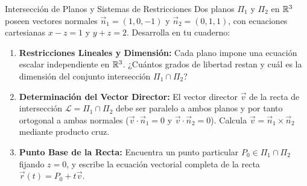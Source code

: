 \documentclass[10pt,aspectratio=169]{beamer}
\begin{document}
\begin{frame}{Intersección de Planos y Sistemas de Restricciones}
  \vspace{0.05cm}
  Dos planos $\Pi_1$ y $\Pi_2$ en $\mathbb{R}^3$ poseen vectores normales $\vec{n}_1 = (1, 0, -1)$ y $\vec{n}_2 = (0, 1, 1)$, con ecuaciones cartesianas $x - z = 1$ y $y + z = 2$. Desarrolla en tu cuaderno:
  \vspace{0.25cm}
  \begin{enumerate}\itemsep10pt
    \item[(a)] \textbf{Restricciones Lineales y Dimensión:} Cada plano impone una ecuación escalar independiente en $\mathbb{R}^3$. ¿Cuántos grados de libertad restan y cuál es la dimensión del conjunto intersección $\Pi_1 \cap \Pi_2$?
    \item[(b)] \textbf{Determinación del Vector Director:} El vector director $\vec{v}$ de la recta de intersección $\mathcal{L} = \Pi_1 \cap \Pi_2$ debe ser paralelo a ambos planos y por tanto ortogonal a ambas normales ($\vec{v} \cdot \vec{n}_1 = 0$ y $\vec{v} \cdot \vec{n}_2 = 0$). Calcula $\vec{v} = \vec{n}_1 \times \vec{n}_2$ mediante producto cruz.
    \item[(c)] \textbf{Punto Base de la Recta:} Encuentra un punto particular $P_0 \in \Pi_1 \cap \Pi_2$ fijando $z = 0$, y escribe la ecuación vectorial completa de la recta $\vec{r}(t) = P_0 + t\vec{v}$.
  \end{enumerate}
\end{frame}
\end{document}
